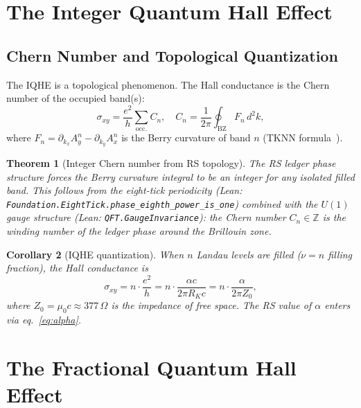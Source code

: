 \documentclass[12pt,a4paper]{article}
\newtheorem{theorem}{Theorem}[section]
\newtheorem{corollary}[theorem]{Corollary}
\theoremstyle{definition}
\theoremstyle{remark}
\begin{document}
\section{The Integer Quantum Hall Effect}
\label{sec:iqhe}

\subsection{Chern Number and Topological Quantization}

The IQHE is a topological phenomenon.  The Hall conductance is the
Chern number of the occupied band(s):
\begin{equation}
  \sigma_{xy} = \frac{e^2}{h}\sum_{\text{occ.}} C_n,
  \quad C_n = \frac{1}{2\pi} \oint_\mathrm{BZ} F_n \, d^2k,
  \label{eq:TKNN}
\end{equation}
where $F_n = \partial_{k_x} A_y^n - \partial_{k_y} A_x^n$ is the Berry
curvature of band $n$ (TKNN formula~\cite{Thouless1982}).

\begin{theorem}[Integer Chern number from RS topology]
\label{thm:chern}
The RS ledger phase structure forces the Berry curvature integral to be
an integer for any isolated filled band.  This follows from the eight-tick
periodicity (Lean: \texttt{Foundation.EightTick.phase\_eighth\_power\_is\_one})
combined with the $U(1)$ gauge structure
(Lean: \texttt{QFT.GaugeInvariance}): the Chern number $C_n \in \mathbb{Z}$
is the winding number of the ledger phase around the Brillouin zone.
\end{theorem}

\begin{corollary}[IQHE quantization]\label{cor:iqhe}
When $n$ Landau levels are filled ($\nu = n$ filling fraction), the
Hall conductance is
\begin{equation}
  \sigma_{xy} = n \cdot \frac{e^2}{h} = n \cdot \frac{\alpha c}{2\pi R_K c}
  = n \cdot \frac{\alpha}{2\pi Z_0},
\end{equation}
where $Z_0 = \mu_0 c \approx 377\,\Omega$ is the impedance of free space.
The RS value of $\alpha$ enters via eq.~\eqref{eq:alpha}.
\end{corollary}

\section{The Fractional Quantum Hall Effect}
\label{sec:fqhe}
\end{document}
